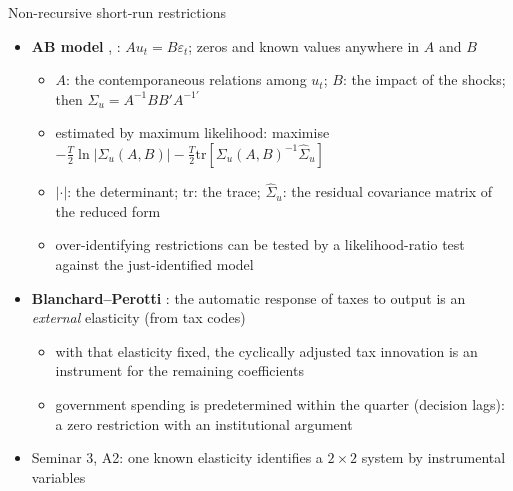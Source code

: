 \begin{frame}{Non-recursive short-run restrictions}
\itemsize{\small}
\begin{itemize}
    \item \textbf{AB model} , : $Au_t = B\varepsilon_t$; zeros and known values anywhere in $A$ and $B$
    \begin{itemize}
        \item $A$: the contemporaneous relations among $u_t$; $B$: the impact of the shocks; then $\Sigma_u = A^{-1}BB'A^{-1\prime}$
        \item estimated by maximum likelihood: maximise $-\frac T2\ln|\Sigma_u(A, B)| - \frac T2\mathrm{tr}[\Sigma_u(A, B)^{-1}\hat\Sigma_u]$
        \item $|\cdot|$: the determinant; $\mathrm{tr}$: the trace; $\hat\Sigma_u$: the residual covariance matrix of the reduced form
        \item over-identifying restrictions can be tested by a likelihood-ratio test against the just-identified model
    \end{itemize}
    \item \textbf{Blanchard--Perotti} : the automatic response of taxes to output is an \emph{external} elasticity (from tax codes)
    \begin{itemize}
        \item with that elasticity fixed, the cyclically adjusted tax innovation is an instrument for the remaining coefficients
        \item government spending is predetermined within the quarter (decision lags): a zero restriction with an institutional argument
    \end{itemize}
    \item Seminar 3, A2: one known elasticity identifies a $2\times2$ system by instrumental variables
\end{itemize}
\end{frame}

